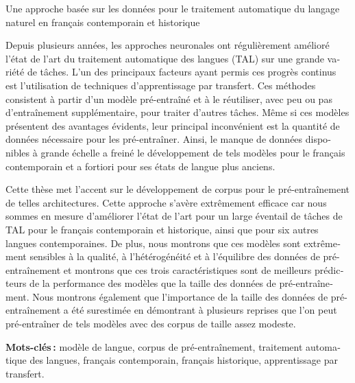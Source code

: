 \newpage  %
\thispagestyle{empty}

\begin{otherlanguage}{french}
    \begin{center}
        Une approche basée sur les données pour le traitement automatique du langage naturel en français contemporain et historique
    \end{center}

    \begingroup
    \scriptsize
    Depuis plusieurs années, les approches neuronales ont régulièrement amélioré l'état de l'art du traitement automatique des langues (TAL) sur une grande variété de tâches. L'un des principaux facteurs ayant permis ces progrès continus est l'utilisation de techniques d'apprentissage par transfert. Ces méthodes consistent à partir d'un modèle pré-entraîné et à le réutiliser, avec peu ou pas d'entraînement supplémentaire, pour traiter d'autres tâches. Même si ces modèles présentent des avantages évidents, leur principal inconvénient est la quantité de données nécessaire pour les pré-entraîner. Ainsi, le manque de données disponibles à grande échelle a freiné le développement de tels modèles pour le français contemporain et a fortiori pour ses états de langue plus anciens.

    Cette thèse met l'accent sur le développement de corpus pour le pré-entraînement de telles architectures. Cette approche s'avère extrêmement efficace car nous sommes en mesure d'améliorer l'état de l'art pour un large éventail de tâches de TAL pour le français contemporain et historique, ainsi que pour six autres langues contemporaines. De plus, nous montrons que ces modèles sont extrêmement sensibles à la qualité, à l'hétérogénéité et à l'équilibre des données de pré-entraînement et montrons que ces trois caractéristiques sont de meilleurs prédicteurs de la performance des modèles que la taille des données de pré-entraînement. Nous montrons également que l'importance de la taille des données de pré-entraînement a été surestimée en démontrant à plusieurs reprises que l'on peut pré-entraîner de tels modèles avec des corpus de taille assez modeste.

    \textbf{Mots-clés :} modèle de langue, corpus de pré-entraînement, traitement automatique des langues, français contemporain, français historique, apprentissage par transfert.
    \endgroup
\end{otherlanguage}

\vspace{1cm}

